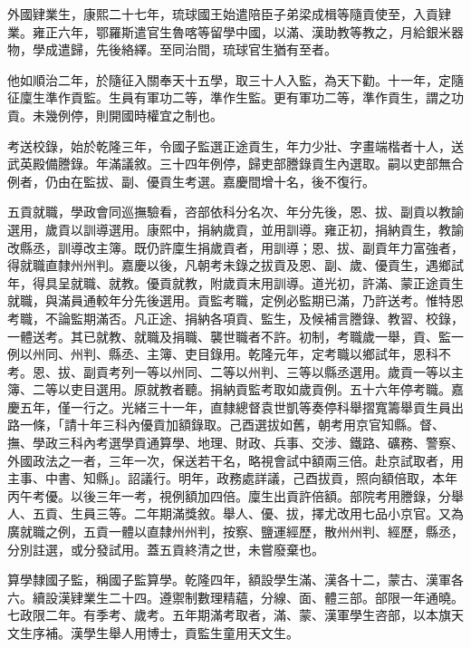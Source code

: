 \begin{pinyinscope}
外國肄業生，康熙二十七年，琉球國王始遣陪臣子弟梁成楫等隨貢使至，入貢肄業。雍正六年，鄂羅斯遣官生魯喀等留學中國，以滿、漢助教等教之，月給銀米器物，學成遣歸，先後絡繹。至同治間，琉球官生猶有至者。

他如順治二年，於隨征入關奉天十五學，取三十人入監，為天下勸。十一年，定隨征廩生準作貢監。生員有軍功二等，準作生監。更有軍功二等，準作貢生，謂之功貢。未幾例停，則開國時權宜之制也。

考送校錄，始於乾隆三年，令國子監選正途貢生，年力少壯、字畫端楷者十人，送武英殿備謄錄。年滿議敘。三十四年例停，歸吏部謄錄貢生內選取。嗣以吏部無合例者，仍由在監拔、副、優貢生考選。嘉慶間增十名，後不復行。

五貢就職，學政會同巡撫驗看，咨部依科分名次、年分先後，恩、拔、副貢以教諭選用，歲貢以訓導選用。康熙中，捐納歲貢，並用訓導。雍正初，捐納貢生，教諭改縣丞，訓導改主簿。既仍許廩生捐歲貢者，用訓導；恩、拔、副貢年力富強者，得就職直隸州州判。嘉慶以後，凡朝考未錄之拔貢及恩、副、歲、優貢生，遇鄉試年，得具呈就職、就教。優貢就教，附歲貢末用訓導。道光初，許滿、蒙正途貢生就職，與滿員通較年分先後選用。貢監考職，定例必監期已滿，乃許送考。惟特恩考職，不論監期滿否。凡正途、捐納各項貢、監生，及候補言謄錄、教習、校錄，一體送考。其已就教、就職及捐職、襲世職者不許。初制，考職歲一舉，貢、監一例以州同、州判、縣丞、主簿、吏目錄用。乾隆元年，定考職以鄉試年，恩科不考。恩、拔、副貢考列一等以州同、二等以州判、三等以縣丞選用。歲貢一等以主簿、二等以吏目選用。原就教者聽。捐納貢監考取如歲貢例。五十六年停考職。嘉慶五年，僅一行之。光緒三十一年，直隸總督袁世凱等奏停科舉摺寬籌舉貢生員出路一條，「請十年三科內優貢加額錄取。己酉選拔如舊，朝考用京官知縣。督、撫、學政三科內考選學貢通算學、地理、財政、兵事、交涉、鐵路、礦務、警察、外國政法之一者，三年一次，保送若干名，略視會試中額兩三倍。赴京試取者，用主事、中書、知縣」。詔議行。明年，政務處詳議，己酉拔貢，照向額倍取，本年丙午考優。以後三年一考，視例額加四倍。廩生出貢許倍額。部院考用謄錄，分舉人、五貢、生員三等。二年期滿獎敘。舉人、優、拔，擇尤改用七品小京官。又為廣就職之例，五貢一體以直隸州州判，按察、鹽運經歷，散州州判、經歷，縣丞，分別註選，或分發試用。蓋五貢終清之世，未嘗廢棄也。

算學隸國子監，稱國子監算學。乾隆四年，額設學生滿、漢各十二，蒙古、漢軍各六。續設漢肄業生二十四。遵禦制數理精蘊，分線、面、體三部。部限一年通曉。七政限二年。有季考、歲考。五年期滿考取者，滿、蒙、漢軍學生咨部，以本旗天文生序補。漢學生舉人用博士，貢監生童用天文生。


\end{pinyinscope}
